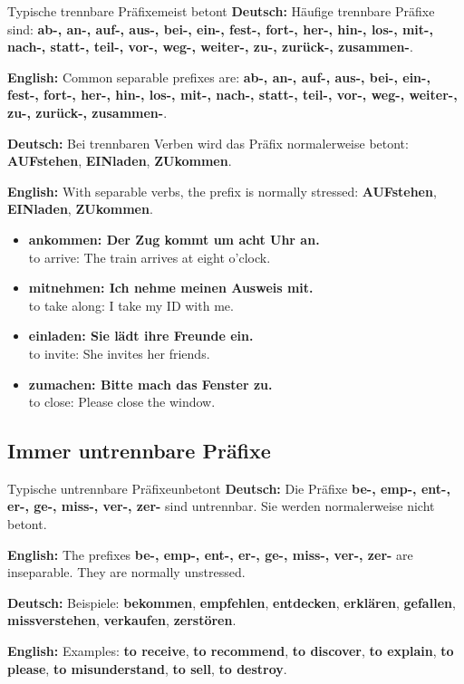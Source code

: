 \documentclass[a4paper,11pt]{article}
\newcommand{\GermanText}[1]{\textbf{Deutsch: }#1\par}
\newcommand{\EnglishText}[1]{{\small\color{SoftGray}\textbf{English: }#1\par}}
\newcommand{\ExampleItem}[2]{\item \textbf{#1}\\{\small\color{SoftGray}#2}}
\begin{document}
        \begin{grammarentry}{Typische trennbare Präfixe}{meist betont}
            \GermanText{Häufige trennbare Präfixe sind: \textbf{ab-, an-, auf-, aus-, bei-, ein-, fest-, fort-, her-, hin-, los-, mit-, nach-, statt-, teil-, vor-, weg-, weiter-, zu-, zurück-, zusammen-}.}
            \EnglishText{Common separable prefixes are: \textbf{ab-, an-, auf-, aus-, bei-, ein-, fest-, fort-, her-, hin-, los-, mit-, nach-, statt-, teil-, vor-, weg-, weiter-, zu-, zurück-, zusammen-}.}

            \GermanText{Bei trennbaren Verben wird das Präfix normalerweise betont: \textbf{AUFstehen}, \textbf{EINladen}, \textbf{ZUkommen}.}
            \EnglishText{With separable verbs, the prefix is normally stressed: \textbf{AUFstehen}, \textbf{EINladen}, \textbf{ZUkommen}.}
        \end{grammarentry}

        \begin{exbox}
            \begin{itemize}
                \ExampleItem{ankommen: Der Zug kommt um acht Uhr an.}{to arrive: The train arrives at eight o'clock.}
                \ExampleItem{mitnehmen: Ich nehme meinen Ausweis mit.}{to take along: I take my ID with me.}
                \ExampleItem{einladen: Sie lädt ihre Freunde ein.}{to invite: She invites her friends.}
                \ExampleItem{zumachen: Bitte mach das Fenster zu.}{to close: Please close the window.}
            \end{itemize}
        \end{exbox}

        \subsection{Immer untrennbare Präfixe}

        \begin{grammarentry}{Typische untrennbare Präfixe}{unbetont}
            \GermanText{Die Präfixe \textbf{be-, emp-, ent-, er-, ge-, miss-, ver-, zer-} sind untrennbar. Sie werden normalerweise nicht betont.}
            \EnglishText{The prefixes \textbf{be-, emp-, ent-, er-, ge-, miss-, ver-, zer-} are inseparable. They are normally unstressed.}

            \GermanText{Beispiele: \textbf{bekommen}, \textbf{empfehlen}, \textbf{entdecken}, \textbf{erklären}, \textbf{gefallen}, \textbf{missverstehen}, \textbf{verkaufen}, \textbf{zerstören}.}
            \EnglishText{Examples: \textbf{to receive}, \textbf{to recommend}, \textbf{to discover}, \textbf{to explain}, \textbf{to please}, \textbf{to misunderstand}, \textbf{to sell}, \textbf{to destroy}.}
        \end{grammarentry}
\end{document}
